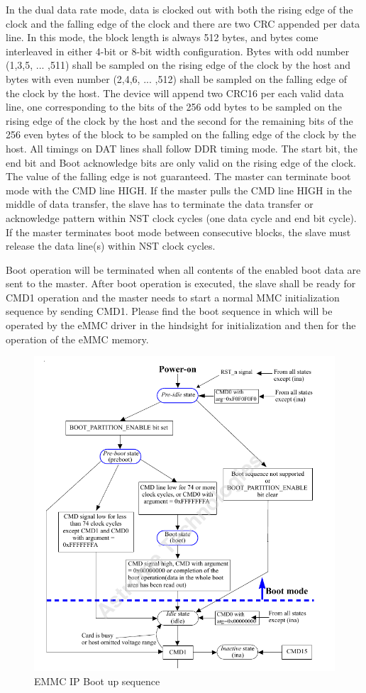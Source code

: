 In the dual data rate mode, data is clocked out with both the rising edge of the clock and the falling edge of the clock and there are two CRC appended per data line. In this mode, the block length is always 512 bytes, and bytes come interleaved in either 4-bit or 8-bit width configuration. Bytes with odd number (1,3,5, ... ,511) shall be sampled on the rising edge of the clock by the host and bytes with even number (2,4,6, ... ,512) shall be sampled on the falling edge of the clock by the host. The device will append two CRC16 per each valid data line, one corresponding to the bits of the 256 odd bytes to be sampled on the rising edge of the clock by the host and the second for the remaining bits of the 256 even bytes of the
block to be sampled on the falling edge of the clock by the host. All timings on DAT lines shall follow DDR timing mode. The start bit, the end bit and Boot acknowledge bits are only valid on the rising edge of the clock. The value of the falling edge is not guaranteed. The master can terminate boot mode with the CMD line HIGH. If the master pulls the CMD line HIGH in the middle of data transfer, the slave has to terminate the data transfer or acknowledge pattern within NST clock cycles (one data cycle and end bit cycle). If the master terminates boot mode between consecutive blocks, the slave must release the data line(s) within NST clock cycles.

Boot operation will be terminated when all contents of the enabled boot data are sent to the master. After boot operation is executed, the slave shall be ready for CMD1 operation and the master needs to start a normal MMC initialization sequence by sending CMD1. Please find the boot sequence in  which will be operated by the eMMC driver in the hindsight for initialization and then for the operation of the eMMC memory.

\begin{figure}[H]
\begin{center}
\includegraphics[width=\textwidth]{images/BootUpSeq.png}
\caption{EMMC IP Boot up sequence}
\label{BootUpSeq}
\end{center}
\end{figure}


\pagebreak
 
